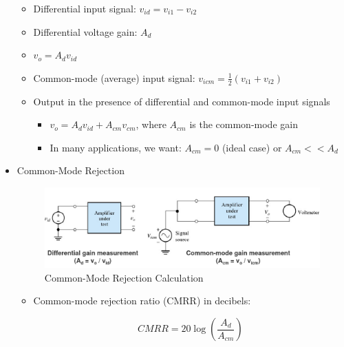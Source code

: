 \begin{itemize}
    \begin{itemize}

      \item Differential input signal: $v_{id}=v_{i1}-v_{i2}$

      \item Differential voltage gain: $A_d$

      \item $v_o=A_dv_{id}$

      \item Common-mode (average) input signal: $v_{icm}=\frac{1}{2}(v_{i1}+v_{i2})$

        \item Output in the presence of differential and common-mode input signals

          \begin{itemize}

            \item $v_o=A_dv_{id}+A_{cm}v_{cm}$, where $A_{cm}$ is the common-mode gain

            \item In many applications, we want: $A_{cm}=0$ (ideal case) or $A_{cm}<<A_d$

          \end{itemize}

    \end{itemize}

  \item Common-Mode Rejection

    \begin{figure}[H]
      \centering
      \includegraphics[width=.7\textwidth]{Images/CMRR.png}
      \caption{Common-Mode Rejection Calculation}
      \label{fig:6}
    \end{figure}

    \begin{itemize}

      \item Common-mode rejection ratio (CMRR) in decibels:

        $$CMRR=20\log\left( \frac{A_d}{A_{cm}} \right)$$

        \begin{itemize}


\end{itemize}
\end{itemize}
\end{itemize}
